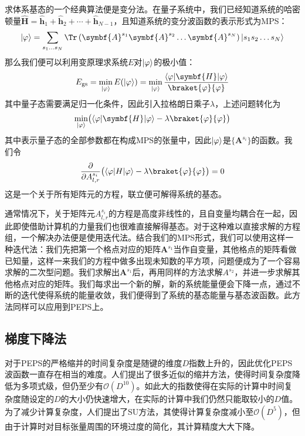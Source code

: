 求体系基态的一个经典算法便是变分法\cite{ErWeiLiangZiDuoTiXiTongDeZhangLiangWangLuoTaiSuanFaZhongGuoBoShiXueWeiLunWenQuanWenShuJuKu}。在量子系统中，我们已经知道系统的哈密顿量$\hat{\symbf{H}}=\hat{\symbf{h}}_1 + \hat{\symbf{h}}_2 + \cdots+ \hat{\symbf{h}}_{N-1}$，且知道系统的变分波函数的表示形式为MPS：
\begin{equation}
\ket{\varphi} = \sum_{s_1\dots s_N}\Tr\left(\symbf{A}^{s_1}\symbf{A}^{s_2}\dots \symbf{A}^{s_N}\right)\ket{s_1 s_2\dots s_N}
\end{equation}
那么我们便可以利用变原理求系统$E$对$\lvert\varphi\rangle$的极小值：
\begin{equation}
E_{\text{gs}}=\min_{\ket{\varphi}}E(\ket{\varphi}) = \min_{\ket{\varphi}}\frac{\bra{\varphi}\symbf{H}\ket{\varphi}}{\braket{\varphi}{\varphi}}
\end{equation}
其中量子态需要满足归一化条件，因此引入拉格朗日乘子$\lambda$，上述问题转化为
\begin{equation}
\min_{\ket{\varphi}}\!\big( \bra{\varphi}\symbf{H}\ket{\varphi} - \lambda\braket{\varphi}{\varphi} \big)
\end{equation}
其中表示量子态的全部参数都在构成MPS的张量中，因此$\lvert\varphi\rangle$是$\{\symbf{A}^{s_i}\}$的函数。我们令
\begin{equation}\label{key}
\frac{\partial}{\partial A^{s_i}_{l,r}}\big( \bra{\varphi}H\ket{\varphi} - \lambda\braket{\varphi}{\varphi} \big) = 0
\end{equation}
这是一个关于所有矩阵元的方程，联立便可解得系统的基态。

通常情况下，关于矩阵元$A^{s_i}_{l,r}$的方程是高度非线性的，且自变量均耦合在一起，因此即使借助计算机的力量我们也很难直接解得基态。对于这种难以直接求解的方程组，一个解决办法便是使用迭代法。结合我们的MPS形式，我们可以使用这样一种迭代法：我们先把第一个格点对应的矩阵$\symbf{A}^{s_1}$当作自变量，其他格点的矩阵看做已知量，这样一来我们的方程中做多出现未知数的平方项，问题便成为了一个容易求解的二次型问题。我们求解出$\symbf{A}^{s_1}$后，再用同样的方法求解$A^{s_2}$，并进一步求解其他格点对应的矩阵。我们每求出一个新的解，新的系统能量便会下降一点，通过不断的迭代使得系统的能量收敛，我们便得到了系统的基态能量与基态波函数。此方法同样可以应用到PEPS上。

\subsection{梯度下降法}

对于PEPS的严格缩并的时间复杂度是随键的维度$D$指数上升的，因此优化PEPS波函数一直存在相当的难度。人们提出了很多近似的缩并方法，使得时间复杂度降低为多项式级，但仍至少有$\mathcal{O}(D^{10})$。如此大的指数使得在实际的计算中时间复杂度随设定的$D$的大小仍快速增大，在实际的计算中我们仍然只能取较小的$D$值。为了减少计算复杂度，人们提出了SU方法，其使得计算复杂度减小至$\mathcal{O}(D^{5})$\cite{wangMonteCarloSimulation2011}，但由于计算时对目标张量周围的环境过度的简化，其计算精度大大下降。

